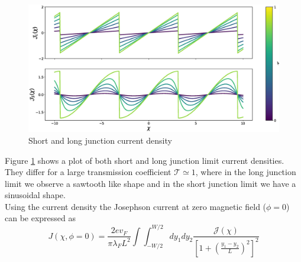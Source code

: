 \begin{figure}
\centering
\includegraphics[width=\textwidth]{figure/analyticalmodel/current_density_all}
\caption{Short and long junction current density}
\label{fig:current_density}
\end{figure}
Figure \ref{fig:current_density} shows a plot of both short and long junction limit current densities. They differ for a large transmission coefficient $\mathcal{T} \simeq 1$, where in the long junction limit we observe a sawtooth like shape and in the short junction limit we have a sinusoidal shape.\\
Using the current density the Josephson current at zero magnetic field ($\phi = 0$) can be expressed as 
\begin{equation}
J\left(\chi, \phi=0\right) = \frac{2 e v_F}{\pi \lambda_F L^2}  \int \int_{-W/2}^{W/2} d y_1 d y_2 \frac{\mathcal{J}(\chi)}{\left[ 1 + \left(\frac{y_1 - y_2}{L}\right)^2\right]^2}
\label{eq:josephson_current_zero_b}
\end{equation}
